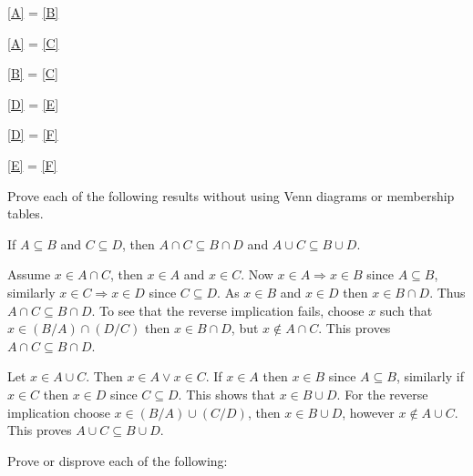 \documentclass[a4paper, english, 12pt]{article} %
\begin{document}
\begin{centering}
  \begin{enumerate*}[itemjoin=\tab, label = \textbf{\alph*)}]
  \item \ref{A} = \ref{B}  
  \item \ref{A} = \ref{C} 
  \item \ref{B} = \ref{C} 
  \item \ref{D} = \ref{E} 
  \item \ref{D} = \ref{F} 
  \item \ref{E} = \ref{F} 
  \end{enumerate*}
\end{centering}

\ans{\newpage}


\begin{problem}[6]
  Prove each of the following results without using Venn diagrams or membership tables.
\end{problem}

\begin{subproblem}[1]
  If $ A \subseteq B$ and $C \subseteq D$, then $A \cap C \subseteq B \cap D$ and $A
  \cup C \subseteq B \cup D$.
\end{subproblem}

\begin{answer}
  Assume $x \in A \cap C$, then $x \in A$ and $x \in C$. Now  $x \in A
  \Rightarrow x \in B$ since $A \subseteq B$, similarly $x \in C \Rightarrow x \in D$ since
  $C \subseteq D$. As $x \in B$ and $x \in D$ then $x \in B \cap D$. Thus $A
  \cap C \subseteq B \cap D$. To see that the reverse implication fails, choose
  $x$ such that $x \in (B / A) \cap (D / C)$ then $x \in B \cap D$, but $x \not
  \in A \cap C$. This proves $A \cap C \subseteq B \cap D$.

  Let $x \in A \cup C$. Then $x \in A \vee x \in C$. If $x \in A$ then $x \in B$
  since $A \subseteq B$, similarly if $x \in C$ then $x \in D$ since $C
  \subseteq D$. This shows that $x \in B \cup D$. For the reverse implication
  choose $ x \in (B / A) \cup (C / D)$, then $x \in B \cup D$, however $x
  \not\in A \cup C$. This proves $A \cup C \subseteq B \cup D$. 
\end{answer}

\begin{problem}
  Prove or disprove each of the following:
\end{problem}
\end{document}
